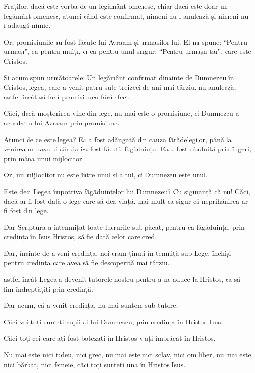 {\par }{\PP {}Fraților, dacă este vorba de un legământ omenesc, chiar dacă este doar un legământ omenesc, atunci când este confirmat, nimeni nu-l anulează și nimeni nu-i adaugă nimic.

Or, promisiunile au fost făcute lui Avraam și urmașilor lui. El nu spune: “Pentru urmași”, ca pentru mulți, ci ca pentru unul singur: “Pentru urmașii tăi”, care este Cristos.

Și acum spun următoarele: Un legământ confirmat dinainte de Dumnezeu în Cristos, legea, care a venit patru sute treizeci de ani mai târziu, nu anulează, astfel încât să facă promisiunea fără efect.

Căci, dacă moștenirea vine din lege, nu mai este o promisiune, ci Dumnezeu a acordat-o lui Avraam prin promisiune.


\par }{\PP {}Atunci de ce este legea? Ea a fost adăugată din cauza fărădelegilor, până la venirea urmașului căruia i-a fost făcută făgăduința. Ea a fost rânduită prin îngeri, prin mâna unui mijlocitor.

Or, un mijlocitor nu este între unul și altul, ci Dumnezeu este unul.


\par }{\PP {}Este deci Legea împotriva făgăduințelor lui Dumnezeu? Cu siguranță că nu! Căci, dacă ar fi fost dată o lege care să dea viață, mai mult ca sigur că neprihănirea ar fi fost din lege.

Dar Scriptura a întemnițat toate lucrurile sub păcat, pentru ca făgăduința, prin credința în Isus Hristos, să fie dată celor care cred.


\par }{\PP {}Dar, înainte de a veni credința, noi eram ținuți în temniță sub Lege, închiși pentru credința care avea să fie descoperită mai târziu.

astfel încât Legea a devenit tutorele nostru pentru a ne aduce la Hristos, ca să fim îndreptățiți prin credință.

Dar acum, că a venit credința, nu mai suntem sub tutore.

Căci voi toți sunteți copii ai lui Dumnezeu, prin credința în Hristos Isus.

Căci toți cei care ați fost botezați în Hristos v-ați îmbrăcat în Hristos.

Nu mai este nici iudeu, nici grec, nu mai este nici sclav, nici om liber, nu mai este nici bărbat, nici femeie, căci toți sunteți una în Hristos Isus.

}
